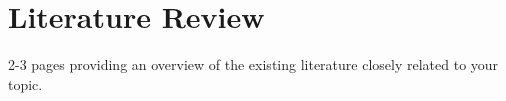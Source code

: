 \documentclass[requirements.tex]{subfiles}
\begin{document}
\section{Literature Review} %
\label{sec:literature_review}

2-3 pages providing an overview of the existing literature closely related to
your topic.

\newpage
\end{document}
